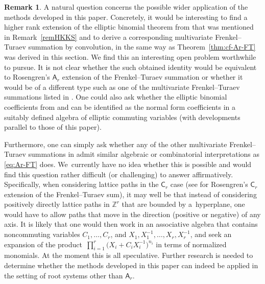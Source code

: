 \documentclass[10pt,a4paper]{amsart}
\numberwithin{equation}{section}
\theoremstyle{definition}
\newtheorem{Remark}[Theorem]{Remark}
\newcommand{\Z}{\mathbb Z}
\begin{document}
\begin{Remark}
 A natural question concerns the possible wider application of the
 methods developed in this paper.
Concretely, it would be interesting to find a higher rank extension of
 the elliptic binomial theorem from
 \cite[Definition~5.6 and Theorem~5.7]{HKKS} that was mentioned
 in Remark~\ref{remHKKS} and to derive a corresponding
 multivariate Frenkel--Turaev summation by convolution, in the same
 way as Theorem~\ref{thm:cf-Ar-FT} was derived in this section.
 We find this an interesting open problem worthwhile to pursue.
 It is not clear whether the such obtained identity would be equivalent
 to Rosengren's $\mathsf A_r$ extension of the Frenkel--Turaev
 summation or whether
 it would be of a different type such as one of the multivariate
 Frenkel--Turaev summations listed in \cite{RW}.
 One could also ask whether the elliptic binomial coefficients from
 \cite{CG} and \cite{R06} can be identified as the normal form coefficients
 in a suitably defined algebra of elliptic commuting variables
 (with developments parallel to those of this paper).

Furthermore, one can simply ask whether any of the other
 multivariate Frenkel--Turaev summations in \cite{RW} admit similar
 algebraic or combinatorial interpretations as \eqref{eq:Ar-FT} does.
 We~currently have no idea whether this is possible and would find
 this question rather difficult (or challenging) to answer affirmatively.
 Specifically, when considering lattice paths in the $\mathsf C_r$ case
 (see \cite[Theorem~7.1]{R04} for Rosengren's $\mathsf C_r$ extension of
 the Frenkel--Turaev sum), it may well be that instead of
 considering positively directly lattice paths in $\Z^r$ that are bounded
 by a~hyperplane, one would have to allow paths that
 move in the direction (positive or negative) of any axis.
It is likely that one would then work in an associative
algebra that contains noncommuting variables
$C_1,\dots,C_r$, and $X_1,X_1^{-1},\dots,X_r,X_r^{-1}$,
and seek an expansion of the product~${\prod_{i=1}^r\bigl(X_i+C_iX_i^{-1}\bigr)^{n_i}}$ in terms of normalized monomials.
 At the moment this is all speculative.
 Further research is needed to determine whether the methods
 developed in this paper can indeed be applied in the setting
 of root systems other than $\mathsf{A}_r$.
\end{Remark}
\end{document}
